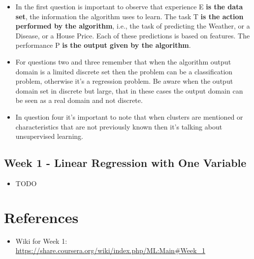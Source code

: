 \documentclass[a4paper]{article}
\begin{document}
\begin{itemize}
\item In the first question is important to observe that experience E \textbf{is the data set}, the information the algorithm uses to learn. The task T \textbf{is the action performed by the algorithm}, i.e., the task of predicting the Weather, or a Disease, or a House Price. Each of these predictions is based on features. The performance P \textbf{is the output given by the algorithm}.
\item For questions two and three remember that when the algorithm output domain is a limited discrete set then the problem can be a classification problem, otherwise it's a regression problem. Be aware when the output domain set in discrete but large, that in these cases the output domain can be seen as a real domain and not discrete.
\item In question four it's important to note that when clusters are mentioned or characteristics that are not previously known then it's talking about unsupervised learning.
\end{itemize}

\subsection{Week 1 - Linear Regression with One Variable}

\begin{itemize}
\item TODO
\end{itemize}

\section{References}

\begin{itemize}
\item Wiki for Week 1: \url{
https://share.coursera.org/wiki/index.php/ML:Main\#Week\_1}
\end{itemize}
\end{document}
